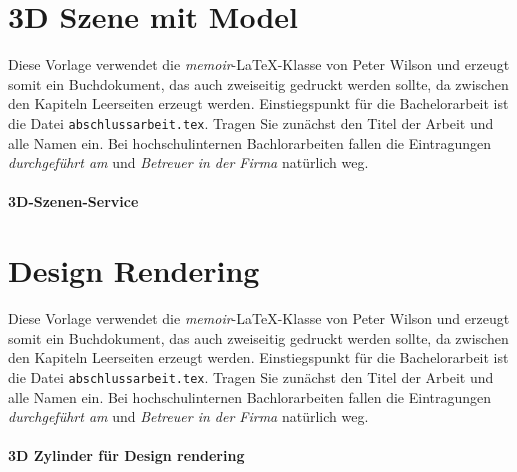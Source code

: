 \section{3D Szene mit Model}
\label{sec:umsetzung}
%
Diese Vorlage verwendet die \textit{memoir}-LaTeX-Klasse von Peter Wilson und erzeugt somit ein Buchdokument, das auch zweiseitig gedruckt werden sollte, da zwischen den Kapiteln Leerseiten erzeugt werden. Einstiegspunkt für die Bachelorarbeit ist die Datei \texttt{abschlussarbeit.tex}. Tragen Sie zunächst den Titel der Arbeit und alle Namen ein. Bei hochschulinternen Bachlorarbeiten fallen die Eintragungen \textit{durchgeführt am} und \textit{Betreuer in der Firma} natürlich weg.
\paragraph{3D-Szenen-Service}
\section{Design Rendering}
\label{sec:umsetzung}
%
Diese Vorlage verwendet die \textit{memoir}-LaTeX-Klasse von Peter Wilson und erzeugt somit ein Buchdokument, das auch zweiseitig gedruckt werden sollte, da zwischen den Kapiteln Leerseiten erzeugt werden. Einstiegspunkt für die Bachelorarbeit ist die Datei \texttt{abschlussarbeit.tex}. Tragen Sie zunächst den Titel der Arbeit und alle Namen ein. Bei hochschulinternen Bachlorarbeiten fallen die Eintragungen \textit{durchgeführt am} und \textit{Betreuer in der Firma} natürlich weg. 
\paragraph{3D Zylinder für Design rendering}


